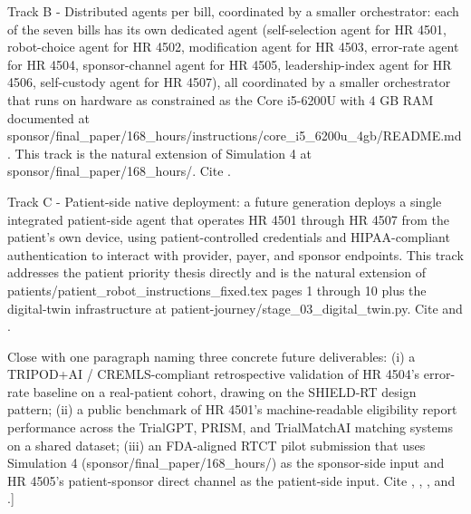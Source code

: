 Track B - Distributed agents per bill, coordinated by a smaller
orchestrator: each of the seven bills has its own dedicated agent
(self-selection agent for HR 4501, robot-choice agent for HR 4502,
modification agent for HR 4503, error-rate agent for HR 4504,
sponsor-channel agent for HR 4505, leadership-index agent for HR
4506, self-custody agent for HR 4507), all coordinated by a smaller
orchestrator that runs on hardware as constrained as the Core
i5-6200U with 4 GB RAM documented at
sponsor/final\_paper/168\_hours/instructions/core\_i5\_6200u\_4gb/README.md.
This track is the natural extension of Simulation 4 at
sponsor/final\_paper/168\_hours/. Cite \cite{kawchak_2026_19396256}.

Track C - Patient-side native deployment: a future generation
deploys a single integrated patient-side agent that operates HR 4501
through HR 4507 from the patient's own device, using
patient-controlled credentials and HIPAA-compliant authentication
to interact with provider, payer, and sponsor endpoints. This track
addresses the patient priority thesis directly and is the natural
extension of patients/patient\_robot\_instructions\_fixed.tex pages
1 through 10 plus the digital-twin infrastructure at
patient-journey/stage\_03\_digital\_twin.py. Cite
\cite{kawchak_2026_18810541} and \cite{kawchak_2026_19119939}.

Close with one paragraph naming three concrete future deliverables:
(i) a TRIPOD+AI / CREMLS-compliant retrospective validation of HR
4504's error-rate baseline on a real-patient cohort, drawing on the
SHIELD-RT design pattern;
(ii) a public benchmark of HR 4501's machine-readable eligibility
report performance across the TrialGPT, PRISM, and TrialMatchAI
matching systems on a shared dataset;
(iii) an FDA-aligned RTCT pilot submission that uses Simulation 4
(sponsor/final\_paper/168\_hours/) as the sponsor-side input and HR
4505's patient-sponsor direct channel as the patient-side input.
Cite \cite{fda_rtct_press_2026},
\cite{kawchak_2026_19994945}, \cite{kawchak_2026_19396256}, and
\cite{kawchak_2026_19119939}.]
